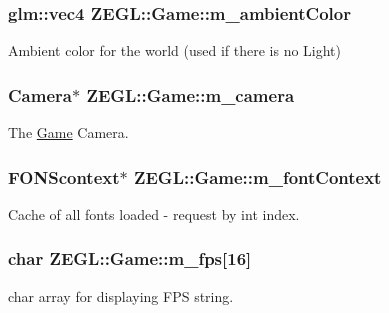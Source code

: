 \subsubsection[{m\+\_\+ambient\+Color}]{\setlength{\rightskip}{0pt plus 5cm}glm\+::vec4 Z\+E\+G\+L\+::\+Game\+::m\+\_\+ambient\+Color\hspace{0.3cm}{\ttfamily [protected]}}\label{class_z_e_g_l_1_1_game_a79bbd0830a4ac01cc820ba5a9bd26cd6}
Ambient color for the world (used if there is no Light) \hypertarget{class_z_e_g_l_1_1_game_a75bf1aabc1dc5ad273611618c3ee05cf}{}
\subsubsection[{m\+\_\+camera}]{\setlength{\rightskip}{0pt plus 5cm}Camera$\ast$ Z\+E\+G\+L\+::\+Game\+::m\+\_\+camera\hspace{0.3cm}{\ttfamily [protected]}}\label{class_z_e_g_l_1_1_game_a75bf1aabc1dc5ad273611618c3ee05cf}
The \hyperlink{class_z_e_g_l_1_1_game}{Game} Camera. \hypertarget{class_z_e_g_l_1_1_game_ab7239deb1a14053ae2d757994f2211d0}{}
\subsubsection[{m\+\_\+font\+Context}]{\setlength{\rightskip}{0pt plus 5cm}F\+O\+N\+Scontext$\ast$ Z\+E\+G\+L\+::\+Game\+::m\+\_\+font\+Context\hspace{0.3cm}{\ttfamily [protected]}}\label{class_z_e_g_l_1_1_game_ab7239deb1a14053ae2d757994f2211d0}
Cache of all fonts loaded -\/ request by int index. \hypertarget{class_z_e_g_l_1_1_game_ab290dd46ec4ff766bd56d0e3013bace1}{}
\subsubsection[{m\+\_\+fps}]{\setlength{\rightskip}{0pt plus 5cm}char Z\+E\+G\+L\+::\+Game\+::m\+\_\+fps\mbox{[}16\mbox{]}\hspace{0.3cm}{\ttfamily [protected]}}\label{class_z_e_g_l_1_1_game_ab290dd46ec4ff766bd56d0e3013bace1}
char array for displaying F\+P\+S string. \hypertarget{class_z_e_g_l_1_1_game_ab301928901efd034fe40d53cdb54caf5}{}
